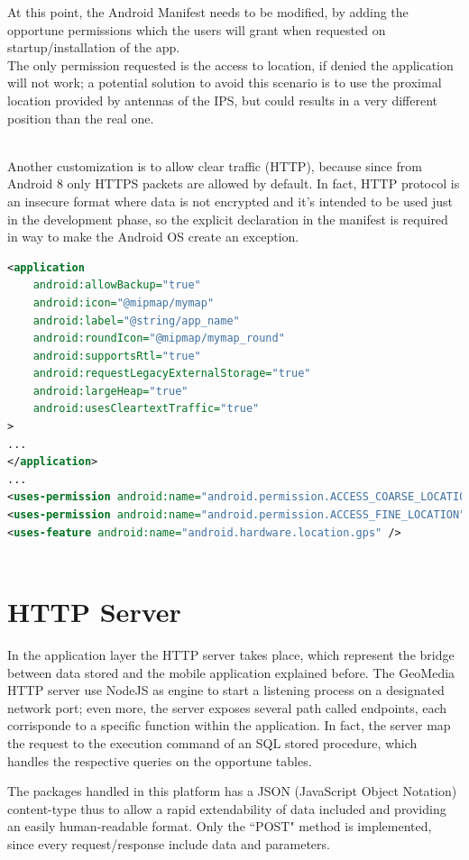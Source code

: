 \documentclass[conference]{IEEEtran}
\begin{document}
At this point, the Android Manifest needs to be modified, by adding the opportune permissions which the users will grant when requested on startup/installation of the app.
\\
The only permission requested is the access to location, if denied the application will not work; a potential solution to avoid this scenario is to use the proximal location provided by antennas of the IPS, but could results in a very different position than the real one.

\\
Another customization is to allow clear traffic (HTTP), because since from Android 8 only HTTPS packets are allowed by default.
In fact, HTTP protocol is an insecure format where data is not encrypted and it's intended to be used just in the development phase, so the explicit declaration in the manifest is required in way to make the Android OS create an exception.

\begin{lstlisting}[language=XML, caption=Snippet of Android Manifest]
<application
    android:allowBackup="true"
    android:icon="@mipmap/mymap"
    android:label="@string/app_name"
    android:roundIcon="@mipmap/mymap_round"
    android:supportsRtl="true"
    android:requestLegacyExternalStorage="true"
    android:largeHeap="true"
    android:usesCleartextTraffic="true"
>
...
</application>
...
<uses-permission android:name="android.permission.ACCESS_COARSE_LOCATION" />
<uses-permission android:name="android.permission.ACCESS_FINE_LOCATION" />
<uses-feature android:name="android.hardware.location.gps" />
        
\end{lstlisting}

\section{HTTP Server}

In the application layer the HTTP server takes place, which represent the bridge between data stored and the mobile application explained before.
The GeoMedia HTTP server use NodeJS\cite{b4} as engine to start a listening process on a designated network port; even more, the server exposes several path called endpoints, each corrisponde to a specific function within the application. In fact, the server map the request to the execution command of an SQL stored procedure, which handles the respective queries on the opportune tables.

The packages handled in this platform has a JSON (JavaScript Object Notation) content-type thus to allow a rapid extendability of data included and providing an easily human-readable format.
Only the ``POST" method is implemented, since every request/response include data and parameters.
\end{document}

